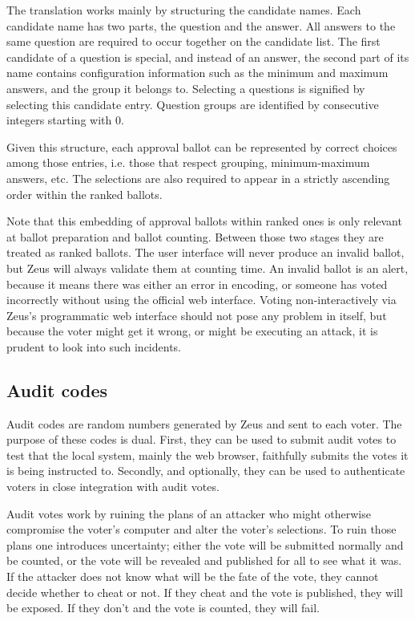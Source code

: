\documentclass[letterpaper,10pt]{article}
\begin{document}
The translation works mainly by structuring the candidate names.
Each candidate name has two parts, the question and the answer.
All answers to the same question are required to occur together
on the candidate list.
The first candidate of a question is special,
and instead of an answer, the second part of its name contains
configuration information such as the minimum and maximum answers,
and the group it belongs to.
Selecting a questions is signified by selecting this candidate entry.
Question groups are identified by consecutive integers starting with 0.

Given this structure, each approval ballot can be represented by
correct choices among those entries, i.e. those that respect
grouping, minimum-maximum answers, etc.
The selections are also required to appear in a strictly ascending order
within the ranked ballots.

Note that this embedding of approval ballots within ranked ones is
only relevant at ballot preparation and ballot counting.
Between those two stages they are treated as ranked ballots.
The user interface will never produce an invalid ballot,
but Zeus will always validate them at counting time.
An invalid ballot is an alert, because it means there was either
an error in encoding, or someone has voted incorrectly without using
the official web interface.
Voting non-interactively via Zeus's programmatic web interface
should not pose any problem in itself,
but because the voter might get it wrong,
or might be executing an attack,
it is prudent to look into such incidents.

\subsection{Audit codes}
\label{sec:audit_codes}
Audit codes are random numbers generated by Zeus and sent to each voter.
The purpose of these codes is dual.
First, they can be used to submit audit votes to test that the local
system, mainly the web browser, faithfully submits the votes it is
being instructed to.
Secondly, and optionally, they can be used to authenticate voters in close
integration with audit votes.

Audit votes work by ruining the plans of an attacker who might otherwise
compromise the voter's computer and alter the voter's selections.
To ruin those plans one introduces uncertainty;
either the vote will be submitted normally and be counted,
or the vote will be revealed and published for all to see what it was.
If the attacker does not know what will be the fate of the vote,
they cannot decide whether to cheat or not.
If they cheat and the vote is published, they will be exposed.
If they don't and the vote is counted, they will fail.
\end{document}
